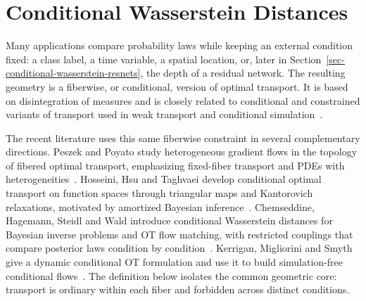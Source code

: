 \section{Conditional Wasserstein Distances}
\label{sec-conditional-wasserstein-distances}

Many applications compare probability laws while keeping an external condition fixed: a class label, a time variable, a spatial location, or, later in Section~\ref{sec-conditional-wasserstein-resnets}, the depth of a residual network. The resulting geometry is a fiberwise, or conditional, version of optimal transport. It is based on disintegration of measures and is closely related to conditional and constrained variants of transport used in weak transport and conditional simulation~\cite{Villani09,SantambrogioBook,backhoff2019weak,oliver2014minimization,BarboniPeyreVialard2024ConditionalResNets}.

The recent literature uses this same fiberwise constraint in several complementary directions. Peszek and Poyato study heterogeneous gradient flows in the topology of fibered optimal transport, emphasizing fixed-fiber transport and PDEs with heterogeneities~\cite{PeszekPoyato2023FiberedOptimalTransport}. Hosseini, Hsu and Taghvaei develop conditional optimal transport on function spaces through triangular maps and Kantorovich relaxations, motivated by amortized Bayesian inference~\cite{HosseiniHsuTaghvaei2023ConditionalFunctionSpaces}. Chemseddine, Hagemann, Steidl and Wald introduce conditional Wasserstein distances for Bayesian inverse problems and OT flow matching, with restricted couplings that compare posterior laws condition by condition~\cite{ChemseddineHagemannSteidlWald2024ConditionalWasserstein}. Kerrigan, Migliorini and Smyth give a dynamic conditional OT formulation and use it to build simulation-free conditional flows~\cite{KerriganMiglioriniSmyth2024DynamicConditionalOT}. The definition below isolates the common geometric core: transport is ordinary within each fiber and forbidden across distinct conditions.


